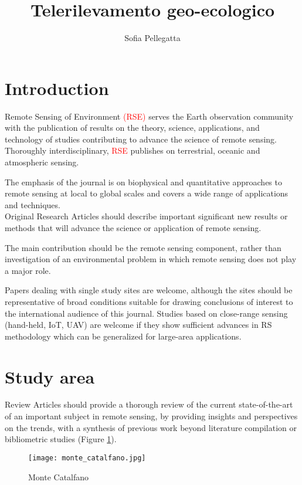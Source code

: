 \documentclass[a4paper, 12pt]{article}
\title{Telerilevamento geo-ecologico}
\author{Sofia Pellegatta}
\newcommand{\tr}{\textcolor{red}}
\begin{document}
\maketitle
\tableofcontents


\section{Introduction}
Remote Sensing of Environment \textcolor{red}{(RSE)} serves the Earth observation community with the publication of results on the theory, science, applications, and technology of studies contributing to advance the science of remote sensing. Thoroughly interdisciplinary, \tr{RSE} publishes on terrestrial, oceanic and atmospheric sensing. 

The emphasis of the journal is on biophysical and quantitative approaches to remote sensing at local to global scales and covers a wide range of applications and techniques.\\

Original Research Articles should describe important significant new results or methods that will advance the science or application of remote sensing. 

\smallskip 
The main contribution should be the remote sensing component, rather than investigation of an environmental problem in which remote sensing does not play a major role. 

\bigskip
Papers dealing with single study sites are welcome, although the sites should be representative of broad conditions suitable for drawing conclusions of interest to the international audience of this journal. Studies based on close-range sensing (hand-held, IoT, UAV) are welcome if they show sufficient advances in RS methodology which can be generalized for large-area applications.


\section{Study area}
Review Articles should provide a thorough review of the current state-of-the-art of an important subject in remote sensing, by providing insights and perspectives on the trends, with a synthesis of previous work beyond literature compilation or bibliometric studies (Figure \ref{fig: monte}).
\begin{figure}
\centering
\texttt{[image: monte\_catalfano.jpg]}
\caption{Monte Catalfano}
\label{fig: monte}
\end{figure}
\end{document}
